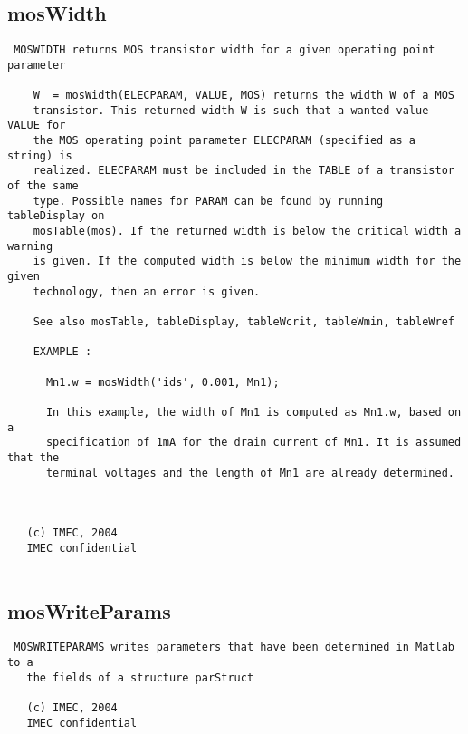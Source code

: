 \newpage
\subsection{mosWidth}
\label{sec:mosWidth}
\begin{verbatim}
 MOSWIDTH returns MOS transistor width for a given operating point parameter 
    
    W  = mosWidth(ELECPARAM, VALUE, MOS) returns the width W of a MOS
    transistor. This returned width W is such that a wanted value VALUE for
    the MOS operating point parameter ELECPARAM (specified as a string) is
    realized. ELECPARAM must be included in the TABLE of a transistor of the same
    type. Possible names for PARAM can be found by running tableDisplay on
    mosTable(mos). If the returned width is below the critical width a warning 
    is given. If the computed width is below the minimum width for the given 
    technology, then an error is given.
 
    See also mosTable, tableDisplay, tableWcrit, tableWmin, tableWref
 
    EXAMPLE :
 
      Mn1.w = mosWidth('ids', 0.001, Mn1);
 
      In this example, the width of Mn1 is computed as Mn1.w, based on a
      specification of 1mA for the drain current of Mn1. It is assumed that the
      terminal voltages and the length of Mn1 are already determined.
 
 
 
   (c) IMEC, 2004
   IMEC confidential 
 

\end{verbatim}

\newpage
\subsection{mosWriteParams}
\label{sec:mosWriteParams}
\begin{verbatim}
 MOSWRITEPARAMS writes parameters that have been determined in Matlab to a
   the fields of a structure parStruct
 
   (c) IMEC, 2004
   IMEC confidential 
 

\end{verbatim}

\newpage
\newpage
